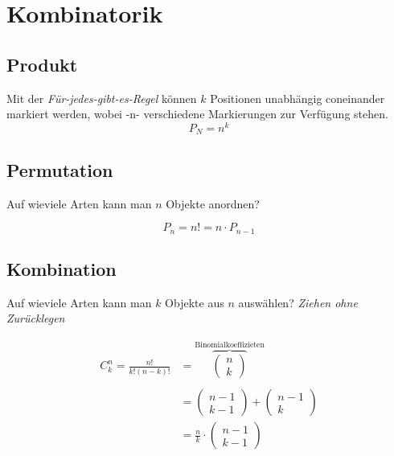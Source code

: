 \section{Kombinatorik}

\subsection{Produkt}
Mit der \textit{Für-jedes-gibt-es-Regel} können $k$ Positionen unabhängig coneinander markiert werden, wobei -n- verschiedene Markierungen zur Verfügung stehen.
\[
P_N = n^k
\]

\subsection{Permutation}
Auf wieviele Arten kann man $n$ Objekte anordnen?

\[
P_n = n! = n \cdot P_{n-1}
\]

\subsection{Kombination}
Auf wieviele Arten kann man $k$ Objekte aus $n$ auswählen? \textit{Ziehen ohne Zurücklegen}

\begin{align*}
	C_k^n = \frac{n!}{k!(n-k)!} &= \overbrace{\begin{pmatrix}	n \\ k \end{pmatrix}}^\text{Binomialkoeffizieten} \\ \\
	&=  \begin{pmatrix}	n - 1 \\ k -1\end{pmatrix} +  \begin{pmatrix}	n -1\\ k \end{pmatrix} \\
	&= \frac{n}{k} \cdot  \begin{pmatrix}	n - 1 \\ k -1\end{pmatrix}
\end{align*}


